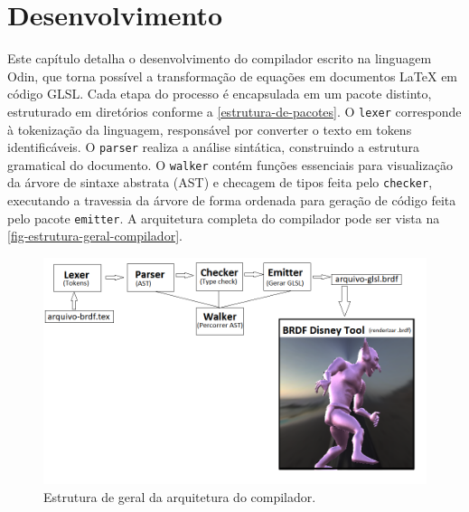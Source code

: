 
\chapter{Desenvolvimento} \label{chapter-dev}

Este capítulo detalha o desenvolvimento do compilador escrito na linguagem Odin, que torna possível a transformação de equações em documentos \LaTeX{} em código GLSL. Cada etapa do processo é encapsulada em um pacote distinto, estruturado em diretórios conforme a \autoref{estrutura-de-pacotes}. O \texttt{lexer} corresponde à tokenização da linguagem, responsável por converter o texto em tokens identificáveis. O \texttt{parser} realiza a análise sintática, construindo a estrutura gramatical do documento. O \texttt{walker} contém funções essenciais para visualização da árvore de sintaxe abstrata (AST) e checagem de tipos feita pelo \texttt{checker}, executando a travessia da árvore de forma ordenada para geração de código feita pelo pacote \texttt{emitter}. A arquitetura completa do compilador pode ser vista na \autoref{fig-estrutura-geral-compilador}.

\begin{figure}[!ht]
  \caption{\label{fig-estrutura-geral-compilador} \small Estrutura de geral da arquitetura do compilador.}
  \begin{center}
    \includegraphics[scale=0.62]{./Imagens/estutura-geral-do-projeto.png}
  \end{center}
\end{figure}


